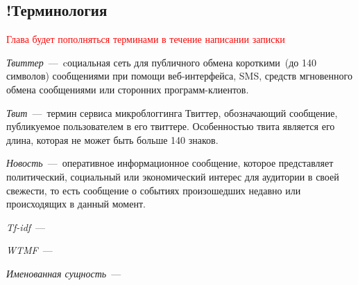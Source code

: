 \subsection{!Терминология}
    \textcolor{red}{Глава будет пополняться терминами в течение написании записки}

    \textit{Твиттер}~---~cоциальная сеть для публичного обмена короткими~(до 140 символов) сообщениями при помощи веб-интерфейса, SMS, средств мгновенного обмена сообщениями или сторонних программ-клиентов.

    \textit{Твит}~---~термин сервиса микроблоггинга Твиттер, обозначающий сообщение, публикуемое пользователем в его твиттере.
    Особенностью твита является его длина, которая не может быть больше 140 знаков.

    \textit{Новость}~---~оперативное информационное сообщение, которое представляет политический, социальный или экономический интерес для аудитории в своей свежести, то есть сообщение о событиях произошедших недавно или происходящих в данный момент.

    \textit{Tf-idf}~---~

    \textit{WTMF}~---~

    \textit{Именованная сущность}~---~

%
%
%
%
%


